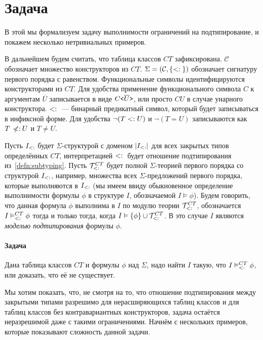 \section{Задача \subtypesat{}}

В этой мы формализуем задачу выполнимости ограничений на подтипирование, и покажем несколько нетривиальных примеров.

В дальнейшем будем считать, что таблица классов $CT$ зафиксирована. $\mathcal{C}$ обозначает множество конструкторов из $CT$. $\Sigma=(\mathcal{C}, \{<:{}\})$ обозначает сигнатуру первого порядка с равенством. Функциональные символы идентифицируются конструкторами из $CT$. Для удобства применение функционального символа $C$ к аргументам $\overline{U}$ записывается в виде $C\texttt{<}\overline{U}\texttt{>}$, или просто $CU$ в случае унарного конструктора. $<:{}$ --- бинарный предикатный символ, который будет записываться в инфиксной форме. Для удобства $\neg(T<:{}U)$ и $\neg(T = U)$ записываются как $T\:\not\!\!{<:}\: U$ и $T\neq U$.


Пусть $I_{<:{}}$ будет $\Sigma$-структурой с доменом $\vert I_{<:{}} \vert$ для всех закрытых типов определённых $CT$, интерпретацией $<:{}$ будет отношение подтипирования из~\autoref{defn:subtyping}. Пусть $\mathcal{T}_{<:{}}^{CT}$ будет полной $\Sigma$-теорией первого порядка со структурой $I_{<:{}}$, например, множества всех $\Sigma$-предложений первого порядка, которые выполняются в $I_{<:{}}$ (мы имеем ввиду обыкновенное определение выполнимости формулы $\phi$ в структуре $I$, обозначаемой $I \vDash \phi$). Будем говорить, что данная формула $\phi$ выполнима в $I$ по модулю теории $\mathcal{T}_{<:{}}^{CT}$, обозначается $I\vDash_{<:{}}^{CT}\phi$ тогда и только тогда, когда $I\vDash \{\phi\}\cup\mathcal{T}_{<:{}}^{CT}$. В это случае $I$ являются \emph{моделью подтипирования} формулы $\phi$.

\paragraph{Задача \subtypesat{}}{
Дана таблица классов $CT$ и формулы $\phi$ над $\Sigma$, надо найти $I$ такую, что $I\vDash_{<:{}}^{CT}\phi$, или доказать, что её не существует.
}

Мы хотим показать, что, не смотря на то, что отношение подтипирования между закрытыми типами разрешимо для нерасширяющихся таблиц классов и для таблиц классов без контравариантных конструкторов, задача \subtypesat{} остаётся неразрешимой даже с такими ограничениями. Начнём с нескольких примеров, которые показывают сложность данной задачи.


